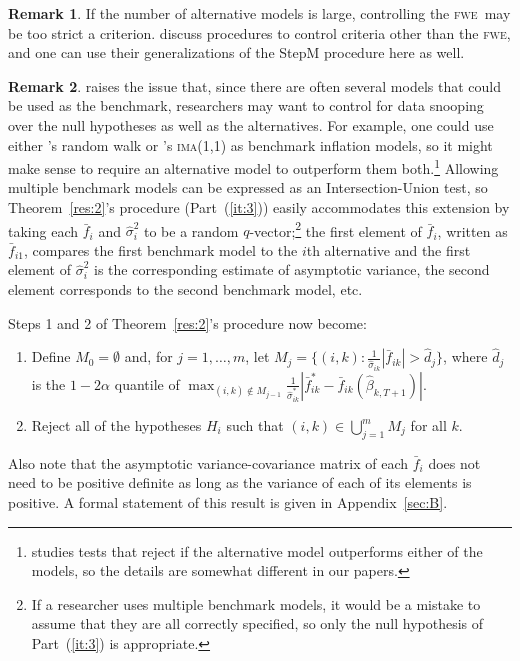 \documentclass[11pt,fleqn]{article}
\newcommand\citepos[2][]{\citeauthor{#2}'s \citeyearpar[#1]{#2}}
\theoremstyle{definition}
\newtheorem{rem}{Remark}
\newcommand{\fwe}{\textsc{fwe}}
\begin{document}
\begin{rem}
  If the number of alternative models is large, controlling the \fwe\
  may be too strict a criterion.  \citet{RSW:08} discuss procedures to
  control criteria other than the \fwe, and one can use their
  generalizations of the StepM procedure here as well.
\end{rem}

\begin{rem}\label{rem:01}
  \citet{Pin:11} raises the issue that, since there are often several
  models that could be used as the benchmark, researchers may want to
  control for data snooping over the null hypotheses as well as the
  alternatives.  For example, one could use either \citepos{AtO:01}
  random walk or \citepos{StW:07} \textsc{ima}(1,1) as benchmark
  inflation models, so it might make sense to require an alternative
  model to outperform them both.\footnote{\citet{Pin:11} studies tests
    that reject if the alternative model outperforms either of the
    models, so the details are somewhat different in our papers.}
  Allowing multiple benchmark models can be expressed as an
  Intersection-Union test, so Theorem~\ref{res:2}'s procedure
  (Part~(\ref{it:3})) easily accommodates this extension by taking
  each $\bar f_i$ and $\hat{\sigma}_{i}^{2}$ to be a random
  $q$-vector;\footnote{If a researcher uses multiple benchmark models,
    it would be a mistake to assume that they are all correctly
    specified, so only the null hypothesis of Part~(\ref{it:3}) is
    appropriate.} the first element of $\bar f_{i}$, written as $\bar
  f_{i1}$, compares the first benchmark model to the $i$th alternative
  and the first element of $\hat{\sigma}_i^2$ is the corresponding
  estimate of asymptotic variance, the second element corresponds to
  the second benchmark model, etc.

  Steps 1 and 2 of Theorem~\ref{res:2}'s procedure now become:
  \begin{enumerate}
  \item Define $M_0 = \emptyset$ and, for $j = 1,\dots,m$, let $M_j =
    \{(i,k): \tfrac1{\hat\sigma_{ik}} |\bar{f}_{ik}| > \hat{d}_j\}$,
    where $\hat{d}_j$ is the $1-2 \alpha$ quantile of $\max_{(i,k)
      \notin M_{j-1}} \tfrac1{\hat\sigma_{ik}^*} |\bar{f}_{ik}^{*} -
    \bar{f}_{ik}(\hat{\beta}_{k,T+1})|$.
  \item Reject all of the hypotheses $H_i$ such that $(i,k) \in
    \bigcup_{j=1}^m M_j$ for all $k$.
  \end{enumerate}
  Also note that the asymptotic variance-covariance matrix of each
  $\bar f_i$ does not need to be positive definite as long as the
  variance of each of its elements is positive.  A formal statement of
  this result is given in Appendix~\ref{sec:B}.
\end{rem}
\end{document}
